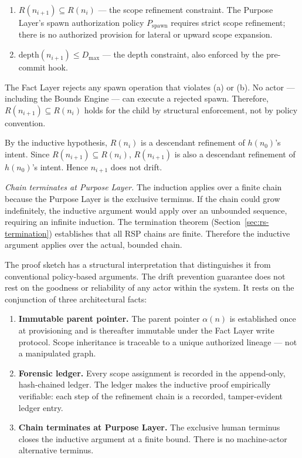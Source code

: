 \begin{enumerate}
    \item[(a)] $R(n_{i+1}) \subseteq R(n_i)$ --- the scope refinement constraint. The Purpose Layer's spawn authorization policy $P_{\text{spawn}}$ requires strict scope refinement; there is no authorized provision for lateral or upward scope expansion.
    \item[(b)] $\text{depth}(n_{i+1}) \leq D_{\text{max}}$ --- the depth constraint, also enforced by the pre-commit hook.
\end{enumerate}

The Fact Layer rejects any spawn operation that violates (a) or (b). No actor --- including the Bounds Engine --- can execute a rejected spawn. Therefore, $R(n_{i+1}) \subseteq R(n_i)$ holds for the child by structural enforcement, not by policy convention.

By the inductive hypothesis, $R(n_i)$ is a descendant refinement of $h(n_0)$'s intent. Since $R(n_{i+1}) \subseteq R(n_i)$, $R(n_{i+1})$ is also a descendant refinement of $h(n_0)$'s intent. Hence $n_{i+1}$ does not drift.

\medskip
\textit{Chain terminates at Purpose Layer.} The induction applies over a finite chain because the Purpose Layer is the exclusive terminus. If the chain could grow indefinitely, the inductive argument would apply over an unbounded sequence, requiring an infinite induction. The termination theorem (Section~\ref{sec:rs-termination}) establishes that all RSP chains are finite. Therefore the inductive argument applies over the actual, bounded chain.

\medskip
The proof sketch has a structural interpretation that distinguishes it from conventional policy-based arguments. The drift prevention guarantee does not rest on the goodness or reliability of any actor within the system. It rests on the conjunction of three architectural facts:

\begin{enumerate}
    \item[(1)] \textbf{Immutable parent pointer.} The parent pointer $\alpha(n)$ is established once at provisioning and is thereafter immutable under the Fact Layer write protocol. Scope inheritance is traceable to a unique authorized lineage --- not a manipulated graph.
    \item[(2)] \textbf{Forensic ledger.} Every scope assignment is recorded in the append-only, hash-chained ledger. The ledger makes the inductive proof empirically verifiable: each step of the refinement chain is a recorded, tamper-evident ledger entry.
    \item[(3)] \textbf{Chain terminates at Purpose Layer.} The exclusive human terminus closes the inductive argument at a finite bound. There is no machine-actor alternative terminus.
\end{enumerate}

